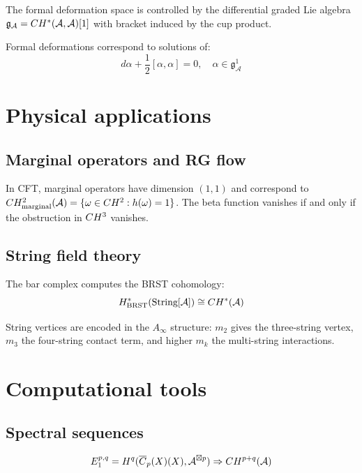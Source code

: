 The formal deformation space is controlled by the differential graded Lie algebra
$\mathfrak{g}_{\mathcal{A}} = CH^*(\mathcal{A}, \mathcal{A})[1]$
with bracket induced by the cup product.

\begin{theorem}\label{thm:maurer-cartan-deformations}
Formal deformations correspond to solutions of:
\[d\alpha + \frac{1}{2}[\alpha, \alpha] = 0, \quad \alpha \in \mathfrak{g}_{\mathcal{A}}^1\]
\end{theorem}

\section{Physical applications}

\subsection{Marginal operators and RG flow}

In CFT, marginal operators have dimension $(1,1)$ and correspond to
$CH^2_{\text{marginal}}(\mathcal{A}) = \{\omega \in CH^2 : h(\omega) = 1\}$.
The beta function vanishes if and only if the obstruction in $CH^3$ vanishes.

\subsection{String field theory}

The bar complex computes the BRST cohomology:
\[H^*_{\text{BRST}}(\text{String}[\mathcal{A}]) \cong CH^*(\mathcal{A})\]

String vertices are encoded in the $A_\infty$ structure: $m_2$ gives the three-string vertex, $m_3$ the four-string contact term, and higher $m_k$ the multi-string interactions.

\section{Computational tools}

\subsection{Spectral sequences}

\begin{theorem}\label{thm:bar-spectral-sequence-hochschild}
\[E_1^{p,q} = H^q(\overline{C}_{p}(X)(X), \mathcal{A}^{\boxtimes p}) \Rightarrow CH^{p+q}(\mathcal{A})\]
\end{theorem}

